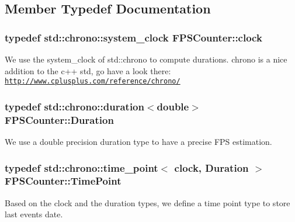 \subsection{Member Typedef Documentation}
\hypertarget{classFPSCounter_aff42afc3b6d4fd2b4fcdb7579fa48031}{
\subsubsection[{clock}]{\setlength{\rightskip}{0pt plus 5cm}typedef std\+::chrono\+::system\+\_\+clock {\bf F\+P\+S\+Counter\+::clock}\hspace{0.3cm}{\ttfamily [private]}}}\label{classFPSCounter_aff42afc3b6d4fd2b4fcdb7579fa48031}
We use the system\+\_\+clock of std\+::chrono to compute durations. chrono is a nice addition to the c++ std, go have a look there\+: \href{http://www.cplusplus.com/reference/chrono/}{\tt http\+://www.\+cplusplus.\+com/reference/chrono/} \hypertarget{classFPSCounter_a2cb0edfdff687339a681ce0349febe4b}{
\subsubsection[{Duration}]{\setlength{\rightskip}{0pt plus 5cm}typedef std\+::chrono\+::duration$<$double$>$ {\bf F\+P\+S\+Counter\+::\+Duration}\hspace{0.3cm}{\ttfamily [private]}}}\label{classFPSCounter_a2cb0edfdff687339a681ce0349febe4b}
We use a double precision duration type to have a precise F\+P\+S estimation. \hypertarget{classFPSCounter_abdab5df998311505d5b39210eb4e4940}{
\subsubsection[{Time\+Point}]{\setlength{\rightskip}{0pt plus 5cm}typedef std\+::chrono\+::time\+\_\+point$<$ {\bf clock}, {\bf Duration} $>$ {\bf F\+P\+S\+Counter\+::\+Time\+Point}\hspace{0.3cm}{\ttfamily [private]}}}\label{classFPSCounter_abdab5df998311505d5b39210eb4e4940}
Based on the clock and the duration types, we define a time point type to store last events date. 

